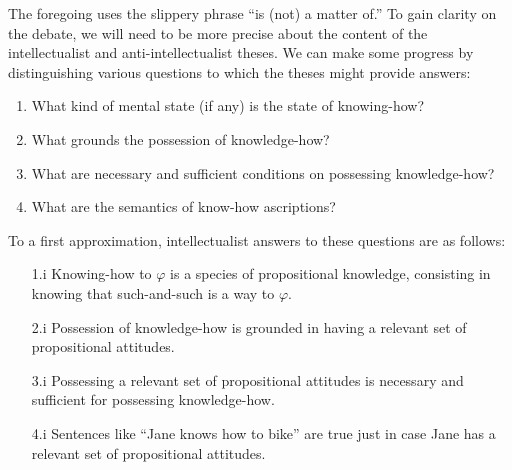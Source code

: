 The foregoing uses the slippery phrase ``is (not) a matter of.''
To gain clarity on the debate, we will need to be more precise about the content of the intellectualist and anti-intellectualist theses.
We can make some progress by distinguishing various questions to which the theses might provide answers:
\begin{enumerate}
	\item What kind of mental state (if any) is the state of knowing-how?
	\item What grounds the possession of knowledge-how?
	\item What are necessary and sufficient conditions on possessing knowledge-how?
	\item What are the semantics of know-how ascriptions?
\end{enumerate}
To a first approximation, intellectualist answers to these questions are as follows: 
\begin{enumerate}
	\item [1.i] Knowing-how to $\varphi$ is a species of propositional knowledge, consisting in knowing that such-and-such is a way to $\varphi$.
	\item [2.i] Possession of knowledge-how is grounded in having a relevant set of propositional attitudes.
	\item [3.i] Possessing a relevant set of propositional attitudes is necessary and sufficient for possessing knowledge-how.
	\item [4.i] Sentences like ``Jane knows how to bike'' are true just in case Jane has a relevant set of propositional attitudes.
\end{enumerate}

